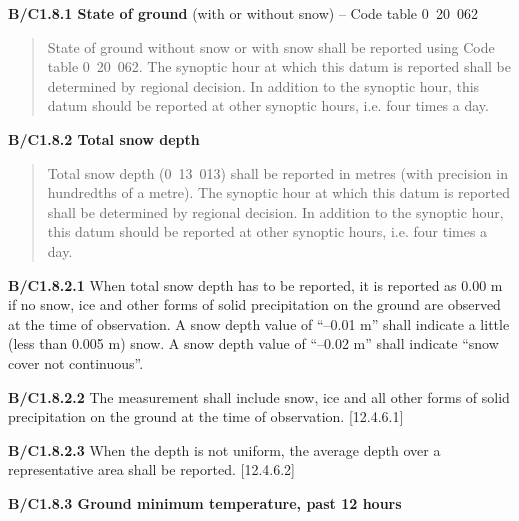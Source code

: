 \textbf{B/C1.8.1 State of ground} (with or without snow) -- Code table 0\emph{~}20\emph{~}062

\begin{quote}
State of ground without snow or with snow shall be reported using Code table 0~20~062. The synoptic hour at which this datum is reported shall be determined by regional decision. In addition to the synoptic hour, this datum should be reported at other synoptic hours, i.e. four times a day.
\end{quote}

\textbf{B/C1.8.2 Total snow depth}

\begin{quote}
Total snow depth (0~13~013) shall be reported in metres (with precision in hundredths of a metre). The synoptic hour at which this datum is reported shall be determined by regional decision. In addition to the synoptic hour, this datum should be reported at other synoptic hours, i.e. four times a day.
\end{quote}

\textbf{B/C1.8.2.1} When total snow depth has to be reported, it is reported as 0.00 m if no snow, ice and other forms of solid precipitation on the ground are observed at the time of observation. A snow depth value of ``--0.01 m'' shall indicate a little (less than 0.005 m) snow. A snow depth value of ``--0.02 m'' shall indicate ``snow cover not continuous''.

\textbf{B/C1.8.2.2} The measurement shall include snow, ice and all other forms of solid precipitation on the ground at the time of observation. {[}12.4.6.1{]}

\textbf{B/C1.8.2.3} When the depth is not uniform, the average depth over a representative area shall be reported. {[}12.4.6.2{]}

\textbf{B/C1.8.3 Ground minimum temperature, past 12 hours}

